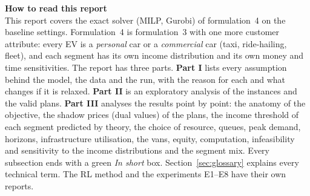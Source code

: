 



\sloppy


\begin{keybox}
{\color{headblue}\textbf{How to read this report}}\\
This report covers the exact solver (MILP, Gurobi) of formulation~4 on the baseline settings. Formulation~4 is formulation~3 with one more customer attribute: every EV is a \emph{personal} car or a \emph{commercial} car (taxi, ride-hailing, fleet), and each segment has its own income distribution and its own money and time sensitivities. The report has three parts. \textbf{Part I} lists every assumption behind the model, the data and the run, with the reason for each and what changes if it is relaxed. \textbf{Part II} is an exploratory analysis of the \NInst{} instances and the \NValid{} valid plans. \textbf{Part III} analyses the results point by point: the anatomy of the objective, the shadow prices (dual values) of the plans, the income threshold of each segment predicted by theory, the choice of resource, queues, peak demand, horizons, infrastructure utilisation, the vans, equity, computation, infeasibility and sensitivity to the income distributions and the segment mix. Every subsection ends with a green \emph{In short} box. Section~\ref{sec:glossary} explains every technical term. The RL method and the experiments E1--E8 have their own reports.
\end{keybox}

